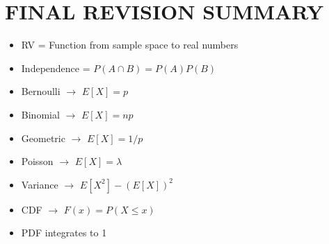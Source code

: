 \documentclass{article}
\begin{document}
\section{FINAL REVISION SUMMARY}
\begin{itemize}
\item RV = Function from sample space to real numbers
\item Independence = $P(A\cap B)=P(A)P(B)$
\item Bernoulli $\rightarrow$ $E[X]=p$
\item Binomial $\rightarrow$ $E[X]=np$
\item Geometric $\rightarrow$ $E[X]=1/p$
\item Poisson $\rightarrow$ $E[X]=\lambda$
\item Variance $\rightarrow$ $E[X^2]-(E[X])^2$
\item CDF $\rightarrow$ $F(x)=P(X\le x)$
\item PDF integrates to 1
\end{itemize}
\end{document}

